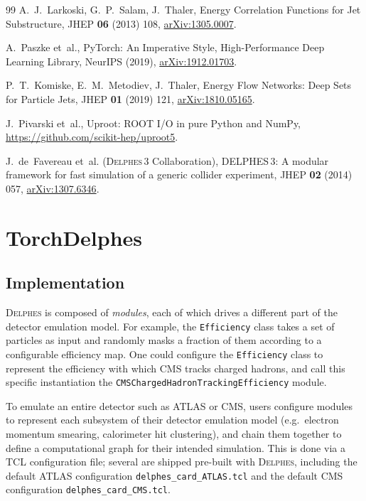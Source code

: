 \documentclass[11pt,a4paper]{article}          %
\begin{document}
\begin{thebibliography}{99}
  A.~J.~Larkoski, G.~P.~Salam, J.~Thaler,
  Energy Correlation Functions for Jet Substructure,
  JHEP \textbf{06} (2013) 108,
  \href{https://arxiv.org/abs/1305.0007}{arXiv:1305.0007}.

  A.~Paszke et~al.,
  PyTorch: An Imperative Style, High-Performance Deep Learning Library,
  NeurIPS (2019),
  \href{https://arxiv.org/abs/1912.01703}{arXiv:1912.01703}.

  P.~T.~Komiske, E.~M.~Metodiev, J.~Thaler,
  Energy Flow Networks: Deep Sets for Particle Jets,
  JHEP \textbf{01} (2019) 121,
  \href{https://arxiv.org/abs/1810.05165}{arXiv:1810.05165}.

  J.~Pivarski et~al.,
  Uproot: ROOT I/O in pure Python and NumPy,
  \url{https://github.com/scikit-hep/uproot5}.

  J.~de~Favereau et~al. (\textsc{Delphes}\,3 Collaboration),
  DELPHES\,3: A modular framework for fast simulation of a generic collider
  experiment,
  JHEP \textbf{02} (2014) 057,
  \href{https://arxiv.org/abs/1307.6346}{arXiv:1307.6346}.

\end{thebibliography}

\appendix
\section{TorchDelphes}
\label{sec:torchdelphes}

\subsection{Implementation}

\textsc{Delphes} is composed of \textit{modules}, each of which drives a
different part of the detector emulation model. For example, the
\texttt{Efficiency} class takes a set of particles as input and randomly
masks a fraction of them according to a configurable efficiency map. One could
configure the \texttt{Efficiency} class to represent the efficiency with which
CMS tracks charged hadrons, and call this specific instantiation the
\texttt{CMSChargedHadronTrackingEfficiency} module.

To emulate an entire detector such as ATLAS or CMS, users configure modules
to represent each subsystem of their detector emulation model (e.g.\ electron
momentum smearing, calorimeter hit clustering), and chain them together to
define a computational graph for their intended simulation. This is done via
a TCL configuration file; several are shipped pre-built with \textsc{Delphes},
including the default ATLAS configuration
\texttt{delphes\_card\_ATLAS.tcl} and the default CMS configuration
\texttt{delphes\_card\_CMS.tcl}.
\end{document}
